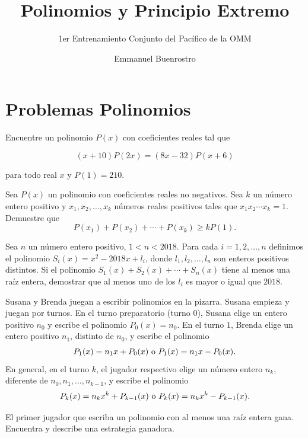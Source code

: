 \documentclass[11pt]{scrartcl}
\title {Polinomios y Principio Extremo}
\subtitle {1er Entrenamiento Conjunto del Pacífico de la OMM}
\author{Emmanuel Buenrostro}
\newcommand{\thmdifficulty}{0}
\newcommand{\problemdiff}[1]{\renewcommand{\thmdifficulty}{#1}}
\begin{document}
\maketitle

\section{Problemas Polinomios}

\problemdiff{3}
\begin{problema}[OMCC 2008/5]
    
    Encuentre un polinomio $ P\left(x\right)$ con coeficientes reales tal que

$$(x+10)P(2x) = (8x - 32)P(x + 6)$$

para todo real $x$ y $P(1) = 210$.

    
\end{problema}

\problemdiff{4}
\begin{problema} [OMCC 2020/5]

    Sea $P(x)$ un polinomio con coeficientes reales no negativos. Sea $k$ un número entero positivo y $x_1, x_2, \dots, x_k$ números reales positivos tales que $x_1x_2\cdots x_k=1$. Demuestre que
\[ P(x_1)+P(x_2)+\cdots+P(x_k)\geq kP(1). \]
\end{problema}


\problemdiff{4}
\begin{problema} [OMCC 2018/5]
    Sea $n$ un número entero positivo, $1< n < 2018$. Para cada $i=1, 2, \ldots ,n$ definimos el polinomio $S_i(x)=x^2-2018x+l_i$, donde $l_1, l_2, \ldots, l_n$ son enteros positivos distintos. Si el polinomio $S_1(x)+S_2(x)+\cdots+S_n(x)$ tiene al menos una raíz entera, demostrar que al menos uno de los $l_i$ es mayor o igual que $2018$.
\end{problema}

\problemdiff{4}
\begin{problema} [OMCC 2017/5]
    
    Susana y Brenda juegan a escribir polinomios en la pizarra. Susana empieza y juegan por turnos.
 En el turno preparatorio (turno $0$), Susana elige un entero positivo $n_0$ y escribe el polinomio $P_0(x)=n_0$. En el turno $1$, Brenda elige un entero positivo $n_1$, distinto de $n_0$, y escribe el polinomio
\[ P_1(x)=n_1x+P_0(x) \textup{ o } P_1(x)=n_1x-P_0(x). \]
En general, en el turno $k$, el jugador respectivo elige un número entero $n_k$, diferente de $n_0, n_1, \ldots, n_{k-1}$, y escribe el polinomio
\[P_k(x)=n_kx^k+P_{k-1}(x) \textup{ o } P_k(x)=n_kx^k-P_{k-1}(x).\]

El primer jugador que escriba un polinomio con al menos una raíz entera gana. Encuentra y describe una estrategia ganadora.

    
\end{problema}
\end{document}

